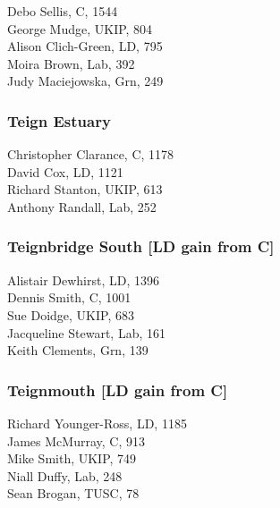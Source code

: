 \documentclass[a4paper,openany,10pt]{book}
\begin{document}


Debo Sellis, C, 1544\\
George Mudge, UKIP, 804\\
Alison Clich-Green, LD, 795\\
Moira Brown, Lab, 392\\
Judy Maciejowska, Grn, 249\\


\subsubsection*{Teign Estuary}



Christopher Clarance, C, 1178\\
David Cox, LD, 1121\\
Richard Stanton, UKIP, 613\\
Anthony Randall, Lab, 252\\


\subsubsection*{Teignbridge South \hspace*{\fill}\nolinebreak[1]%
\enspace\hspace*{\fill}
[LD gain from C]}



Alistair Dewhirst, LD, 1396\\
Dennis Smith, C, 1001\\
Sue Doidge, UKIP, 683\\
Jacqueline Stewart, Lab, 161\\
Keith Clements, Grn, 139\\


\subsubsection*{Teignmouth \hspace*{\fill}\nolinebreak[1]%
\enspace\hspace*{\fill}
[LD gain from C]}



{Richard Younger-Ross}, LD, 1185\\
James McMurray, C, 913\\
Mike Smith, UKIP, 749\\
Niall Duffy, Lab, 248\\
Sean Brogan, TUSC, 78\\
\end{document}
